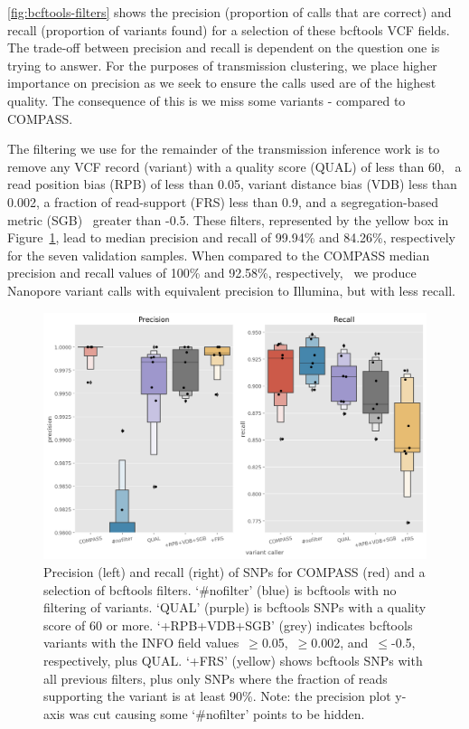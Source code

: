 \autoref{fig:bcftools-filters} shows the precision (proportion
of calls that are correct) and recall (proportion of variants found) for
a selection of these bcftools VCF fields. The trade-off between
precision and recall is dependent on the question one is trying to
answer. For the purposes of transmission clustering, we place higher importance on
precision as we seek to ensure the calls used are of the highest
quality. The consequence of this is we miss some variants - compared to
COMPASS.

The filtering we use for the remainder of the transmission inference
work is to remove any VCF record (variant) with a quality score (QUAL)
of less than 60,~ a read position bias (RPB) of less than 0.05, variant
distance bias (VDB) less than 0.002, a fraction of read-support (FRS)
less than 0.9, and a segregation-based metric (SGB)~ greater than -0.5.
These filters, represented by the yellow box in
Figure~{\ref{fig:bcftools-filters}}, lead to median precision and
recall of 99.94\% and 84.26\%, respectively for the seven validation
samples. When compared to the COMPASS median precision and recall values
of 100\% and 92.58\%, respectively,~ we produce Nanopore variant calls
with equivalent precision to Illumina, but with less recall.

\begin{figure}
\begin{center}
\includegraphics[width=0.90\columnwidth]{Chapter2/Figs/bcftools-precision-recall-filters.png}
\caption{{Precision (left) and recall (right) of SNPs for COMPASS (red) and a
selection of bcftools filters. `\#nofilter' (blue) is bcftools with no
filtering of variants. `QUAL' (purple) is bcftools SNPs with a quality score of
60 or more. `+RPB+VDB+SGB' (grey) indicates bcftools variants with the INFO
field values~\(\ge\)0.05,~\(\ge\)0.002,
and~\(\le\)-0.5, respectively, plus QUAL. `+FRS' (yellow) shows
bcftools SNPs with all previous filters, plus only SNPs where the
fraction of reads supporting the variant is at least 90\%. Note: the
precision plot y-axis was cut causing some `\#nofilter' points to be
hidden.
{\label{fig:bcftools-filters}}%
}}
\end{center}
\end{figure}

